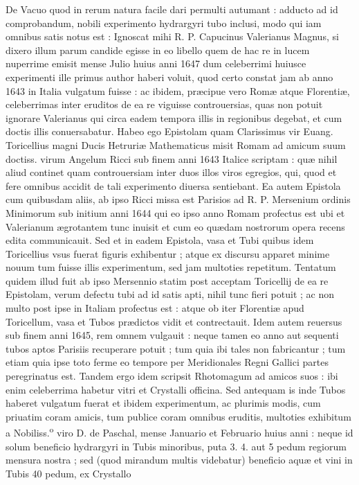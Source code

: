 \documentclass[11pt,a4paper]{article}
\begin{document}
De Vacuo quod in rerum natura facile dari permulti autumant : adducto ad id comprobandum, nobili experimento hydrargyri tubo inclusi, modo qui iam omnibus satis notus est : Ignoscat mihi R. P. Capucinus Valerianus Magnus, si dixero illum parum candide egisse in eo libello quem de hac re in lucem nuperrime emisit mense Julio huius anni 1647 dum celeberrimi huiusce experimenti ille primus author haberi voluit, quod certo constat jam ab anno 1643 in Italia vulgatum fuisse : ac ibidem, præcipue vero Romæ atque Florentiæ, celeberrimas inter eruditos de ea re viguisse controuersias, quas non potuit ignorare Valerianus qui circa eadem tempora illis in regionibus degebat, et cum doctis illis conuersabatur. Habeo ego Epistolam quam Clarissimus vir Euang. Toricellius magni Ducis Hetruriæ Mathematicus misit Romam ad amicum suum doctiss. virum Angelum Ricci sub finem anni 1643 Italice scriptam : quæ nihil aliud continet quam controuersiam inter duos illos viros egregios, qui, quod et fere omnibus accidit de tali experimento diuersa sentiebant. Ea autem Epistola cum quibusdam aliis, ab ipso Ricci missa est Parisios ad R. P. Mersenium ordinis Minimorum sub initium anni 1644 qui eo ipso anno Romam profectus est ubi et Valerianum ægrotantem tunc inuisit et cum eo quædam nostrorum opera recens edita communicauit. Sed et in eadem Epistola, vasa et Tubi quibus idem Toricellius vsus fuerat figuris exhibentur ; atque ex discursu apparet minime nouum tum fuisse illis experimentum, sed jam multoties repetitum. Tentatum quidem illud fuit ab ipso Mersennio statim post acceptam Toricellij de ea re Epistolam, verum defectu tubi ad id satis apti, nihil tunc fieri potuit ; ac non multo post ipse in Italiam profectus est : atque ob iter Florentiæ apud Toricellum, vasa et Tubos prædictos vidit et contrectauit. Idem autem reuersus sub finem anni 1645, rem omnem vulgauit : neque tamen eo anno aut sequenti tubos aptos Parisiis recuperare potuit ; tum quia ibi tales non fabricantur ; tum etiam quia ipse toto ferme eo tempore per Meridionales Regni Gallici partes peregrinatus est. Tandem ergo idem scripsit Rhotomagum ad amicos suos : ibi enim celeberrima habetur vitri et Crystalli officina. Sed antequam is inde Tubos haberet vulgatum fuerat et ibidem experimentum, ac plurimis modis, cum priuatim coram amicis, tum publice coram omnibus eruditis, multoties exhibitum a Nobiliss.\textsuperscript{o} viro D. de Paschal, mense Januario et Februario huius anni : neque id solum beneficio hydrargyri in Tubis minoribus, puta 3. 4. aut 5 pedum regiorum mensura nostra ; sed (quod mirandum multis videbatur) beneficio aquæ et vini in Tubis 40 pedum, ex Crystallo
\end{document}
